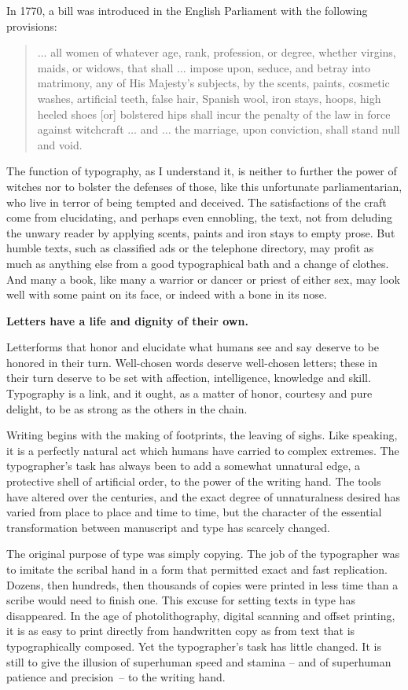 In 1770, a bill was introduced in the English Parliament with the following provisions:
\begin{quote}$\ldots$ all women of whatever age, rank, profession, or degree, whether virgins, maids, or widows, that shall $\ldots$ impose upon, seduce, and betray into matrimony, any of His Majesty's subjects, by the scents, paints, cosmetic washes, artificial teeth, false hair, Spanish wool, iron stays, hoops, high heeled shoes {\rm [}or{\rm ]} bolstered hips shall incur the pen\-alty of the law in force against witchcraft $\ldots$ and $\ldots$ the marriage, upon conviction, shall stand null and void.
\end{quote}
The function of typography, as I understand it, is neither to further the power of witches nor to bolster the defenses of those, like this unfortunate parliamentarian, who live in terror of being tempted and deceived. The satisfactions of the craft come from elucidating, and perhaps even ennobling, the text, not from deluding the unwary reader by applying scents, paints and iron stays to empty prose. But humble texts, such as classified ads or the telephone directory, may profit as much as anything else from a good typographical bath and a change of clothes. And many a book, like many a warrior or dancer or priest of either sex, may look well with some paint on its face, or indeed with a bone in its nose.

\textbf{Letters have a life and dignity of their own.}

Letterforms that honor and elucidate what humans see and say deserve to be honored in their turn. Well-chosen words deserve well-chosen letters; these in their turn deserve to be set with affection, intelligence, knowledge and skill. Typography is a link, and it ought, as a matter of honor, courtesy and pure delight, to be as strong as the others in the chain.

Writing begins with the making of footprints, the leaving of sighs. Like speaking, it is a perfectly natural act which humans have carried to complex extremes. The typographer's task has always been to add a somewhat unnatural edge, a protective shell of artificial order, to the power of the writing hand. The tools have altered over the centuries, and the exact degree of unnaturalness desired has varied from place to place and time to time, but the character of the essential transformation between manuscript and type has scarcely changed.

The original purpose of type was simply copying. The job of the typographer was to imitate the scribal hand in a form that permitted exact and fast replication. Dozens, then hundreds, then thousands of copies were printed in less time than a scribe would need to finish one. This excuse for setting texts in type has disappeared. In the age of photolithography, digital scanning and offset printing, it is as easy to print directly from handwritten copy as from text that is typographically composed. Yet the typographer's task has little changed. It is still to give the illusion of superhuman speed and stamina -- and of superhuman patience and precision~-- to the writing hand.

